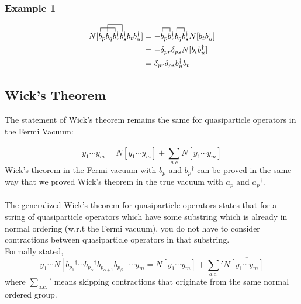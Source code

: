 \documentclass{article}
\newcommand{\ol}{\overline}
\newcommand{\fctr}{\contraction}
\newcommand{\dg}{\ensuremath{^\dagger} }
\newcommand{\cd}{\ensuremath{\cdots} }
\begin{document}
\subsubsection{Example 1}
\begin{align*}
N[\fctr{}{b}{{}_p b_q}{b}
\fctr[2ex]{ b_p}{b}{{}_q b_r\dg}{b}
 b_p b_q b_r\dg b_s\dg b_t b_u\dg ]  &= 
 - \fctr{}{b}{{}_p}{b}b_p b_r\dg \fctr{}{b}{{}_q}{b}b_q b_s\dg N[b_t b_u\dg] \\
 &= - \delta_{pr}\delta_{ps}N[b_t b_u\dg] \\
 &= \delta_{pr}\delta_{ps} b_u\dg b_t 
\end{align*}

\subsection{Wick's Theorem }

The statement of Wick's theorem remains the same for quasiparticle operators in the Fermi Vacuum: 

\[y_1 \cd y_m = N[y_1\cd y_m] + \sum_{a.c} N\ol{[y_1 \cd y_m]} \]
Wick's theorem in the Fermi vacuum with $b_p$ and $b_p\dg$ 
can be proved in the same way that we proved Wick's theorem in the true vacuum with 
$a_p$ and $a_p\dg$.
\\ \\
The generalized Wick's theorem for quasiparticle operators states 
that for a string of quasiparticle operators which have some substring which is already in normal ordering (w.r.t the Fermi vacuum),
you do not have to consider contractions between quasiparticle operators in that substring.\\
Formally stated,
$$y_1 \cd N[b_{p_1}\dg \cd b_{p_\alpha}\dg b_{p_{\alpha + 1}} b_{p_\beta}] \cd y_m = N[y_1 \cd y_m ]  + \sum_{a.c.} {}' N\ol{[y_1 \cd y_m ]} $$
where $\sum_{a.c.} {}'$ means skipping contractions that originate from the same normal ordered group.
\end{document}
